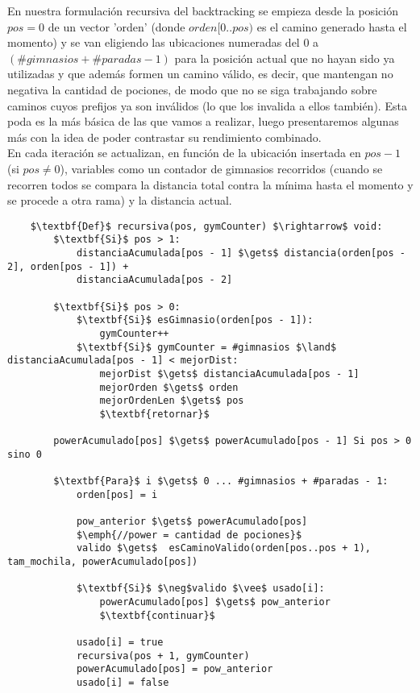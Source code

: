     En nuestra formulación recursiva del backtracking se empieza desde la posición $pos = 0$ de un vector 'orden' (donde $orden[0..pos)$ es el camino generado hasta el momento) y se van eligiendo las ubicaciones numeradas del 0 a $(\#gimnasios + \#paradas - 1)$ para la posición actual que no hayan sido ya utilizadas y que además formen un camino válido, es decir, que mantengan no negativa la cantidad de pociones, de modo que no se siga trabajando sobre caminos cuyos prefijos ya son inválidos (lo que los invalida a ellos también). Esta poda es la más básica de las que vamos a realizar, luego presentaremos algunas más con la idea de poder contrastar su rendimiento combinado.
    \\

    En cada iteración se actualizan, en función de la ubicación insertada en $pos-1$ (si $pos \neq 0$), variables como un contador de gimnasios recorridos (cuando se recorren todos se compara la distancia total contra la mínima hasta el momento y se procede a otra rama) y la distancia actual.
    \newpage

    \begin{lstlisting}
    $\textbf{Def}$ recursiva(pos, gymCounter) $\rightarrow$ void:
        $\textbf{Si}$ pos > 1:
            distanciaAcumulada[pos - 1] $\gets$ distancia(orden[pos - 2], orden[pos - 1]) +
            distanciaAcumulada[pos - 2]

        $\textbf{Si}$ pos > 0:
            $\textbf{Si}$ esGimnasio(orden[pos - 1]):
                gymCounter++
            $\textbf{Si}$ gymCounter = #gimnasios $\land$ distanciaAcumulada[pos - 1] < mejorDist:
                mejorDist $\gets$ distanciaAcumulada[pos - 1]
                mejorOrden $\gets$ orden
                mejorOrdenLen $\gets$ pos
                $\textbf{retornar}$

        powerAcumulado[pos] $\gets$ powerAcumulado[pos - 1] Si pos > 0 sino 0

        $\textbf{Para}$ i $\gets$ 0 ... #gimnasios + #paradas - 1:
            orden[pos] = i

            pow_anterior $\gets$ powerAcumulado[pos]
            $\emph{//power = cantidad de pociones}$
            valido $\gets$  esCaminoValido(orden[pos..pos + 1), tam_mochila, powerAcumulado[pos])

            $\textbf{Si}$ $\neg$valido $\vee$ usado[i]:
                powerAcumulado[pos] $\gets$ pow_anterior
                $\textbf{continuar}$

            usado[i] = true
            recursiva(pos + 1, gymCounter)
            powerAcumulado[pos] = pow_anterior
            usado[i] = false
    \end{lstlisting}

